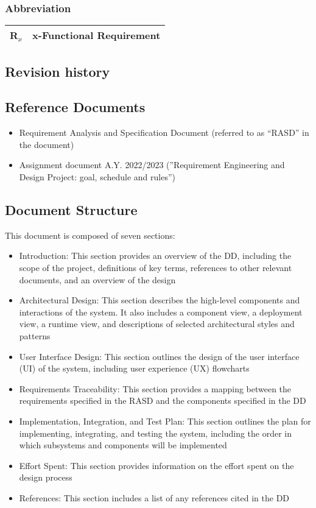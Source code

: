 \subsubsection{Abbreviation}
\begin{table}[H]
    \begin{tabularx}{\textwidth}{cX}
        \toprule
        \textbf{R$_x$} & x-Functional Requirement \\
        \bottomrule
    \end{tabularx}
\end{table}
\subsection{Revision history}
\subsection{Reference Documents}
\begin{itemize}
    \item Requirement Analysis and Specification Document (referred to as “RASD” in the document)
    \item Assignment document A.Y. 2022/2023 (”Requirement Engineering and Design Project: goal, schedule
          and rules”)
\end{itemize}
\subsection{Document Structure}

This document is composed of seven sections:
\begin{itemize}
    \item Introduction: This section provides an overview of the DD, including the scope of the project, definitions of key terms, references to other relevant documents, and an overview of the design
    \item Architectural Design: This section describes the high-level components and interactions of the system. It also includes a component view, a deployment view, a runtime view, and descriptions of selected architectural styles and patterns
    \item User Interface Design: This section outlines the design of the user interface (UI) of the system, including user experience (UX) flowcharts
    \item Requirements Traceability: This section provides a mapping between the requirements specified in the RASD and the components specified in the DD
    \item Implementation, Integration, and Test Plan: This section outlines the plan for implementing, integrating, and testing the system, including the order in which subsystems and components will be implemented
    \item Effort Spent: This section provides information on the effort spent on the design process
    \item References: This section includes a list of any references cited in the DD
\end{itemize}
